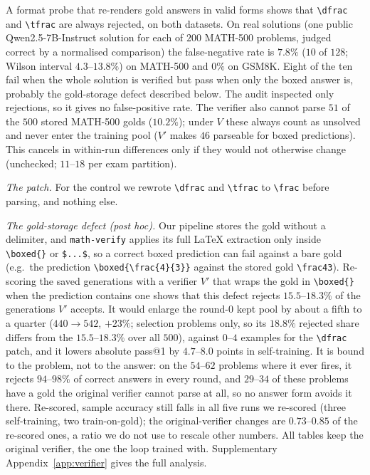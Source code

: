 \documentclass[runningheads]{llncs}
\begin{document}
A format probe that re-renders gold answers in valid forms shows
that \verb|\dfrac| and \verb|\tfrac| are always rejected, on both
datasets. On real solutions (one public
Qwen2.5-7B-Instruct solution for each of $200$ MATH-500 problems, judged
correct by a normalised comparison) the false-negative rate is
$7.8\%$ ($10$ of $128$; Wilson interval $4.3$--$13.8\%$) on MATH-500 and $0\%$
on GSM8K. Eight of the ten fail when the whole solution is verified but pass
when only the boxed answer is, probably the gold-storage defect described below. The audit inspected only rejections, so it gives no
false-positive rate. The verifier also cannot parse $51$ of the $500$ stored
MATH-500 golds ($10.2\%$); under $V$ these always count as unsolved and never
enter the training pool ($V'$ makes $46$ parseable for boxed predictions). This
cancels in within-run differences only if they would not otherwise change
(unchecked; $11$--$18$ per exam partition).

\emph{The patch.} For the control we rewrote \verb|\dfrac| and \verb|\tfrac| to
\verb|\frac| before parsing, and nothing else.

\emph{The gold-storage defect (post hoc).} Our pipeline stores the gold without
a delimiter, and \texttt{math-verify} applies its full \LaTeX{} extraction only
inside \verb|\boxed{}| or \verb|$...$|, so a correct boxed prediction can fail
against a bare gold (e.g.\ the prediction \verb|\boxed{\frac{4}{3}}| against
the stored gold \verb|\frac43|). Re-scoring the saved generations with a
verifier $V'$ that wraps the gold in \verb|\boxed{}| when the prediction
contains one shows that this defect rejects $15.5$--$18.3\%$ of the
generations $V'$ accepts. It would enlarge the round-0 kept pool by about a
fifth to a quarter ($440\to542$, $+23\%$; selection problems only, so its $18.8\%$ rejected share differs from the $15.5$--$18.3\%$ over all $500$), against $0$--$4$ examples for the \verb|\dfrac| patch, and
it lowers absolute pass@1 by $4.7$--$8.0$ points in self-training. It is bound
to the problem, not to the answer: on the $54$--$62$ problems where it ever
fires, it rejects $94$--$98\%$ of correct answers in every round, and $29$--$34$
of these problems have a gold the original verifier cannot parse at all, so no
answer form avoids it there. Re-scored, sample accuracy still falls in all five
runs we re-scored (three self-training, two train-on-gold); the original-verifier changes are $0.73$--$0.85$ of the
re-scored ones, a ratio we do not use to rescale other numbers. All tables keep the original verifier, the one the loop trained
with. Supplementary Appendix~\ref{app:verifier} gives the full analysis.
\end{document}
